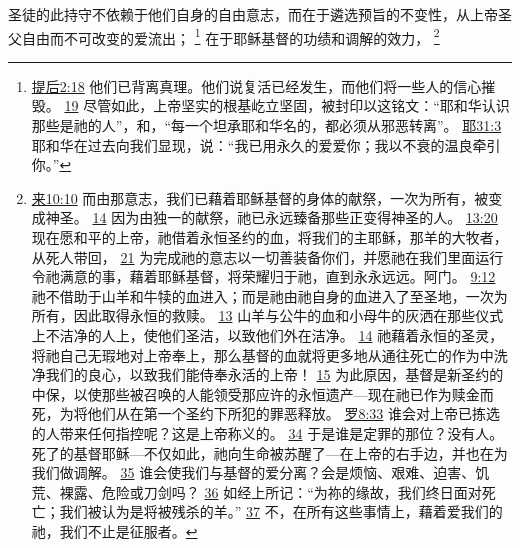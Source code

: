 \documentclass[12pt, a4paper, oneside]{ctexart}
\newcounter{parnum}[section]
\newcommand{\N}{%
   \noindent\refstepcounter{parnum}%
    \makebox[\parindent][l]{\textbf{\arabic{parnum}.}}}
\begin{document}
\N 圣徒的此持守不依赖于他们自身的自由意志，而在于遴选预旨的不变性，从上帝圣父自由而不可改变的爱流出；
	\footnote {
		\href{https://biblehub.com/2_timothy/2-18.htm}{提后2:18} 他们已背离真理。他们说复活已经发生，而他们将一些人的信心摧毁。
		\href{https://biblehub.com/2_timothy/2-19.htm}{19} 尽管如此，上帝坚实的根基屹立坚固，被封印以这铭文：“耶和华认识那些是祂的人”，和，“每一个坦承耶和华名的，都必须从邪恶转离”。
		\href{https://biblehub.com/jeremiah/31-3.htm}{耶31:3} 耶和华在过去向我们显现，说：“我已用永久的爱爱你；我以不衰的温良牵引你。”
	}
	在于耶稣基督的功绩和调解的效力，
	\footnote {
		\href{https://biblehub.com/hebrews/10-10.htm}{来10:10} 而由那意志，我们已藉着耶稣基督的身体的献祭，一次为所有，被变成神圣。
		\href{https://biblehub.com/hebrews/10-14.htm}{14} 因为由独一的献祭，祂已永远臻备那些正变得神圣的人。
		\href{https://biblehub.com/hebrews/13-20.htm}{13:20} 现在愿和平的上帝，祂借着永恒圣约的血，将我们的主耶稣，那羊的大牧者，从死人带回，
		\href{https://biblehub.com/hebrews/13-21.htm}{21} 为完成祂的意志以一切善装备你们，并愿祂在我们里面运行令祂满意的事，藉着耶稣基督，将荣耀归于祂，直到永永远远。阿门。
		\href{https://biblehub.com/hebrews/9-12.htm}{9:12} 祂不借助于山羊和牛犊的血进入；而是祂由祂自身的血进入了至圣地，一次为所有，因此取得永恒的救赎。
		\href{https://biblehub.com/hebrews/9-13.htm}{13} 山羊与公牛的血和小母牛的灰洒在那些仪式上不洁净的人上，使他们圣洁，以致他们外在洁净。
		\href{https://biblehub.com/hebrews/9-14.htm}{14} 祂藉着永恒的圣灵，将祂自己无瑕地对上帝奉上，那么基督的血就将更多地从通往死亡的作为中洗净我们的良心，以致我们能侍奉永活的上帝！
		\href{https://biblehub.com/hebrews/9-15.htm}{15} 为此原因，基督是新圣约的中保，以使那些被召唤的人能领受那应许的永恒遗产---现在祂已作为赎金而死，为将他们从在第一个圣约下所犯的罪恶释放。
		\href{https://biblehub.com/romans/8-33.htm}{罗8:33} 谁会对上帝已拣选的人带来任何指控呢？这是上帝称义的。
		\href{https://biblehub.com/romans/8-34.htm}{34} 于是谁是定罪的那位？没有人。死了的基督耶稣---不仅如此，祂向生命被苏醒了---在上帝的右手边，并也在为我们做调解。
		\href{https://biblehub.com/romans/8-35.htm}{35} 谁会使我们与基督的爱分离？会是烦恼、艰难、迫害、饥荒、裸露、危险或刀剑吗？
		\href{https://biblehub.com/romans/8-36.htm}{36} 如经上所记：“为祢的缘故，我们终日面对死亡；我们被认为是将被残杀的羊。”
		\href{https://biblehub.com/romans/8-37.htm}{37} 不，在所有这些事情上，藉着爱我们的祂，我们不止是征服者。
}
\end{document}
